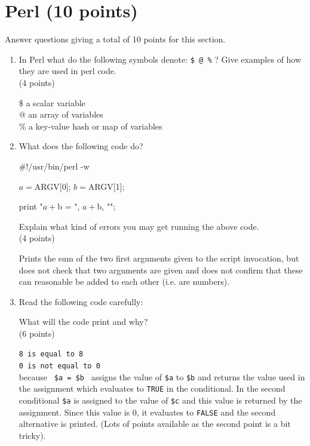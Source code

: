 \documentclass[11pt]{article}
\begin{document}
\section{Perl (10 points)}
Answer questions giving a total of 10 points for this section.
\begin{enumerate}
\item In Perl what do the following symbols denote: \verb|$ @ %| ? Give
  examples of how they are used in perl code.\\
(4 points)

\begin{Notes}
  \$ a scalar variable\\
  @ an array of variables\\
  \% a key-value hash or map of variables
\end{Notes}

\item What does the following code do?

  \begin{perlcode}
  #!/usr/bin/perl -w
    
  $a = $ARGV[0];
  $b = $ARGV[1];

  print "$a + $b = ", $a + $b, "\n";
  \end{perlcode}
  Explain what kind of errors you may get running the above code.\\
  (4 points)

\begin{Notes}
  Prints the sum of the two first arguments given to the script invocation,
  but does not check that two arguments are given and does not confirm that
  these can reasonable be added to each other (i.e. are numbers).
\end{Notes}

\item Read the following code carefully:

  What will the code print and why?\\
  (6 points)

\begin{Notes}
  \verb|8 is equal to 8|\\
  \verb|0 is not equal to 0|\\
  because \verb| $a = $b | assigns the value of \verb|$a| to \verb|$b| and
  returns the value used in the assignment which evaluates to \verb|TRUE| in
  the conditional. In the second conditional \verb|$a| is
  assigned to the value of \verb|$c| and this value is returned by the
  assignment. Since this value is 0, it evaluates to \verb|FALSE| and the
  second alternative is printed. (Lots of points available as the second
  point is a bit tricky).
\end{Notes}


\end{enumerate}
\end{document}
